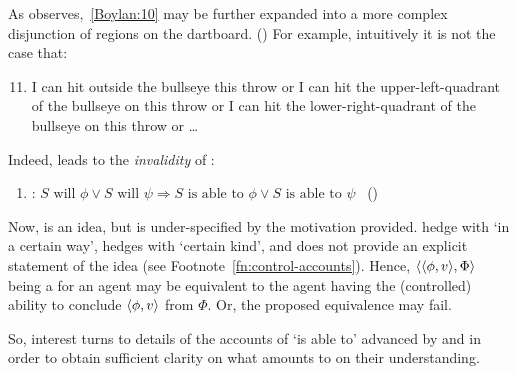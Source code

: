 \begin{note}[\BoyVS{}]
    As \citeauthor{Boylan:2020aa} observes,~\ref{Boylan:10} may be further expanded into a more complex disjunction of regions on the dartboard.
  (\citeyear[4]{Boylan:2020aa})
  For example, intuitively it is not the case that:
  \begin{enumerate}[label=(\arabic*'), resume]
    \setcounter{enumi}{10}
  \item
    I can hit outside the bullseye this throw or I can hit the upper-left-quadrant of the bullseye on this throw or I can hit the lower-right-quadrant of the bullseye on this throw or \dots
  \end{enumerate}

  Indeed, \AbControl{} leads to the \emph{invalidity} of \BoyVS{}:

  \begin{enumerate}[label=]
  \item
    \label{Boylan:Or-Success}
    \BoyVS{}: \(S\text{ will }\phi \lor S\text{ will }\psi \Rightarrow S\text{ is able to }\phi \lor S\text{ is able to }\psi\)%
    \mbox{ }\hfill\mbox{(\citeyear[\S1.2]{Boylan:2020aa})}
  \end{enumerate}
\end{note}

\begin{note}
  Now, \AbControl{} is an idea, but is under-specified by the motivation provided.
  \citeauthor{Mandelkern:2017aa} hedge with `in a certain way', \citeauthor{Schwarz:2020aa} hedges with `certain kind', and \citeauthor{Boylan:2020aa} does not provide an explicit statement of the idea (see Footnote~\ref{fn:control-accounts}).
  Hence, \(\langle \langle \phi, v \rangle, \Phi \rangle\) being a  for an agent may be equivalent to the agent having the (controlled) ability to conclude \(\langle\phi, v\rangle\) from \(\Phi\).
  Or, the proposed equivalence may fail.

  So, interest turns to details of the accounts of `is able to' advanced by \textcite{Mandelkern:2017aa} and \textcite{Boylan:2020aa} in order to obtain sufficient clarity on what \AbControl{} amounts to on their understanding.
\end{note}

